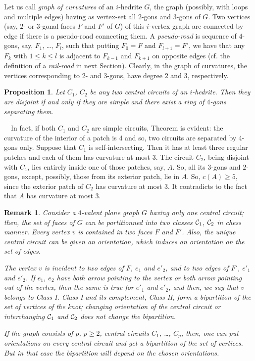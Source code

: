\documentclass[12pt]{article}
\newtheorem{proposition}{Proposition}
\newtheorem{remark}{Remark}
\newcommand{\proof}{\noindent{\bf Proof.}\ \ }
\begin{document}
Let us call {\em graph of curvatures} of an $i$-hedrite $G$, the
graph (possibly, with loops and multiple edges) having as vertex-set
all $2$-gons and $3$-gons of $G$. 
Two vertices (say, $2$- or $3$-gonal faces $F$ and $F'$ of $G$) of 
this $i$-vertex graph are connected by edge if there is a pseudo-road 
connecting them. A {\em pseudo-road} is sequence of $4$-gons, say,
$F_1$, \dots, $F_l$, such that putting $F_0=F$ and $F_{l+1}=F'$, 
we have that any $F_k$ with $1\leq k\leq l$ is adjacent to $F_{k-1}$ 
and $F_{k+1}$ on opposite edges (cf. the definition of
a {\em rail-road} in next Section). Clearly, in the graph of curvatures, 
the vertices corresponding to $2$- and $3$-gons, have degree $2$ and $3$, 
respectively.




\begin{proposition}\label{intersec}
Let $C_1$, $C_2$ be any two central circuits of an $i$-hedrite. Then 
they are disjoint if and only if they are simple and there exist a 
ring of $4$-gons separating them.

\end{proposition}
\proof In fact, if both $C_1$ and $C_2$ are simple circuits, Theorem 
is evident: the curvature of the interior of a patch is $4$ and so, two
circuits are separated by $4$-gons only. Suppose that $C_1$ is 
self-intersecting. Then it has at least three regular patches and each 
of them has curvature at most $3$.
The circuit $C_2$, being disjoint with $C_1$, lies entirely inside one 
of those patches, say, $A$. So, all its $3$-gons and $2$-gons, except, 
possibly, those from its exterior patch, lie in $A$. So, $c(A)\geq 5$,
since the exterior patch of $C_2$ has curvature at most $3$.
It contradicts to the fact that $A$ has curvature at most $3$. 


\begin{remark}
Consider a $4$-valent plane graph $G$ having only one central circuit;
then, the set of faces of $G$ can be partitionned into two classes
${\cal C}_1$, ${\cal C}_2$ in chess manner. Every vertex $v$ is 
contained in two faces $F$ and $F'$. Also, the unique central circuit 
can be given an orientation, which induces an orientation on the set
of edges.

The vertex $v$ is incident to two edges of $F$, $e_1$ and $e'_2$, 
and to two edges of $F'$, $e'_1$ and $e'_2$. If $e_1$, $e_2$ 
have both arrow pointing to the vertex or both arrow pointing out 
of the vertex, then the same is true for $e'_1$ and $e'_2$, and then,
we say that $v$ {\em belongs to Class I}.
Class I and its complement, Class II, form a bipartition of the
set of vertices of the knot; changing orientation of the central
circuit or interchanging ${\cal C}_1$ and ${\cal C}_2$ does not 
change the bipartition. 

If the graph consists of $p$, $p\geq 2$, central circuits $C_1$, \dots, $C_p$,
then, one can put orientations on every central circuit and get
a bipartition of the set of vertices. But in that case the 
bipartition will depend on the chosen orientations.
\end{remark}
\end{document}
